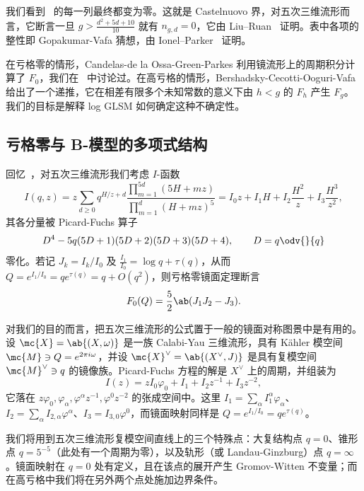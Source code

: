 我们看到~ 的每一列最终都变为零。这就是 Castelnuovo 界，对五次三维流形而言，它断言一旦 \(g > \frac{d^2+5d+10}{10}\) 就有 \(n_{g,d} = 0\)，它由 Liu--Ruan~\cite{LiuRuanCastelnuovo} 证明。表中各项的整性即 Gopakumar-Vafa 猜想，由 Ionel--Parker~\cite{IonelParker2018} 证明。

在亏格零的情形，Candelas-de la Ossa-Green-Parkes 利用镜流形上的周期积分计算了 \(F_0\)，我们在~ 中讨论过。在高亏格的情形，Bershadsky-Cecotti-Ooguri-Vafa 给出了一个递推，它在相差有限多个未知常数的意义下由 \(h < g\) 的 \(F_h\) 产生 \(F_g\)。我们的目标是解释 log GLSM 如何确定这种不确定性。

\subsection{亏格零与 B-模型的多项式结构}%
\label{sub:Genus zero and the polynomial structure of the B-model}

回忆~，对五次三维流形我们考虑 \(I\)-函数
\[
    I(q,z) = z\sum_{d \geq 0} q^{H/z+d} \frac{\prod_{m=1}^{5d}(5H+mz)}{\prod_{m=1}^d (H+mz)^5} = I_0 z + I_1 H + I_2 \frac{H^2}{z} + I_3 \frac{H^3}{z^2},
\]
其各分量被 Picard-Fuchs 算子
\[ D^4 - 5q(5D+1)(5D+2)(5D+3)(5D+4), \qquad D = q \odv{}{q} \]
零化。若记 \(J_k = I_k/I_0\) 及 \(\frac{I_1}{I_0} = \log q + \tau(q)\)，从而 \(Q = e^{I_1/I_0} = qe^{\tau(q)} = q + O(q^2)\)，则亏格零镜面定理断言
\[ F_0(Q) = \frac{5}{2}\ab(J_1 J_2 - J_3). \]

对我们的目的而言，把五次三维流形的公式置于一般的镜面对称图景中是有用的。设 \(\mc{X} = \ab\{(X,\omega)\}\) 是一族 Calabi-Yau 三维流形，具有 Kähler 模空间 \(\mc{M} \ni Q = e^{2\pi i \omega}\)，并设 \(\mc{X}^{\vee} = \ab\{(X^{\vee},J)\}\) 是具有复模空间 \(\mc{M}^{\vee} \ni q\) 的镜像族。Picard-Fuchs 方程的解是 \(X^{\vee}\) 上的周期，并组装为
\[ I(z) = zI_0\varphi_0 + I_1 + I_2 z^{-1} + I_3 z^{-2}, \]
它落在 \(z\varphi_0, \varphi_{\alpha}, \varphi^{\alpha}z^{-1}, \varphi^0 z^{-2}\) 的张成空间中。这里 \(I_1 = \sum_{\alpha} I_1^{\alpha}\varphi_{\alpha}\)、\(I_2 = \sum_{\alpha} I_{2,\alpha}\varphi^{\alpha}\)、\(I_3 = I_{3,0}\varphi^0\)，而镜面映射同样是 \(Q = e^{I_1/I_0} = qe^{\tau(q)}\)。

我们将用到五次三维流形复模空间直线上的三个特殊点：大复结构点 \(q=0\)、锥形点 \(q = 5^{-5}\)（此处有一个周期为零），以及轨形（或 Landau-Ginzburg）点 \(q = \infty\)。镜面映射在 \(q=0\) 处有定义，且在该点的展开产生 Gromov-Witten 不变量；而在高亏格中我们将在另外两个点处施加边界条件。

